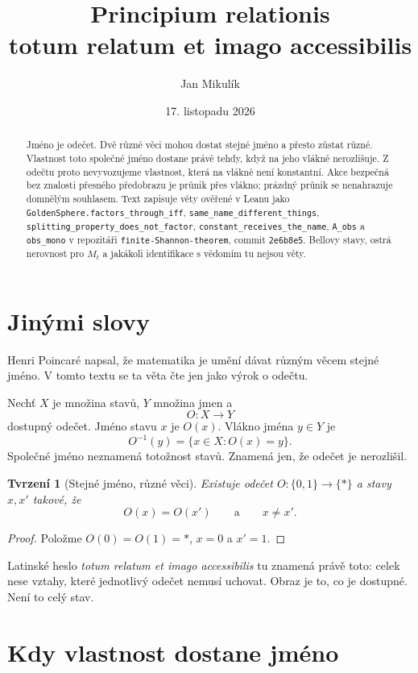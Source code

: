 \documentclass[11pt,a4paper]{article}
\title{\textbf{Principium relationis}\\[4pt]
\large totum relatum et imago accessibilis}
\author{Jan Mikulík}
\date{17. listopadu 2026}
\newtheorem{proposition}[theorem]{Tvrzení}
\theoremstyle{definition}
\theoremstyle{remark}
\begin{document}
\maketitle

\begin{abstract}
Jméno je odečet. Dvě různé věci mohou dostat stejné jméno a přesto zůstat různé.
Vlastnost toto společné jméno dostane právě tehdy, když na jeho vlákně nerozlišuje.
Z odečtu proto nevyvozujeme vlastnost, která na vlákně není konstantní.
Akce bezpečná bez znalosti přesného předobrazu je průnik přes vlákno; prázdný průnik
se nenahrazuje domnělým souhlasem.
Text zapisuje věty ověřené v Leanu jako
\texttt{GoldenSphere.factors\_through\_iff},
\texttt{same\_name\_different\_things},
\texttt{splitting\_property\_does\_not\_factor},
\texttt{constant\_receives\_the\_name},
\texttt{A\_obs} a \texttt{obs\_mono}
v repozitáři \texttt{finite-Shannon-theorem}, commit \texttt{2e6b8e5}.
Bellovy stavy, ostrá nerovnost pro \(M_t\) a jakákoli identifikace s vědomím tu nejsou věty.
\end{abstract}

\section{Jinými slovy}

Henri Poincaré napsal, že matematika je umění dávat různým věcem stejné jméno.
V tomto textu se ta věta čte jen jako výrok o odečtu.

Nechť \(X\) je množina stavů, \(Y\) množina jmen a
\[
  O\colon X\to Y
\]
dostupný odečet. Jméno stavu \(x\) je \(O(x)\).
Vlákno jména \(y\in Y\) je
\[
  O^{-1}(y)=\{x\in X:O(x)=y\}.
\]
Společné jméno neznamená totožnost stavů. Znamená jen, že odečet je nerozlišil.

\begin{proposition}[Stejné jméno, různé věci]
Existuje odečet \(O\colon\{0,1\}\to\{\ast\}\) a stavy \(x,x'\) takové, že
\[
  O(x)=O(x')\qquad\text{a}\qquad x\neq x'.
\]
\end{proposition}

\begin{proof}
Položme \(O(0)=O(1)=\ast\), \(x=0\) a \(x'=1\).
\end{proof}

Latinské heslo \emph{totum relatum et imago accessibilis} tu znamená právě toto:
celek nese vztahy, které jednotlivý odečet nemusí uchovat.
Obraz je to, co je dostupné. Není to celý stav.

\section{Kdy vlastnost dostane jméno}
\end{document}
